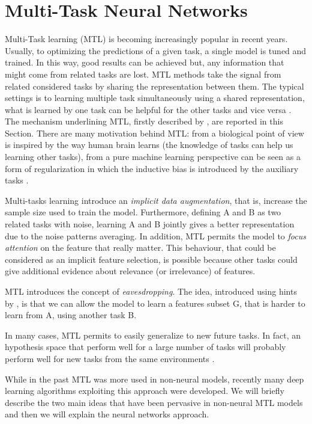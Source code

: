 \section{Multi-Task Neural Networks}\label{sec:MTLsection}
Multi-Task learning (MTL) is becoming increasingly popular in recent years.
Usually, to optimizing the predictions of a given task, a single model is
tuned and trained. In this way, good results can be achieved but, any
information that might come from related tasks are lost. MTL methods take
the signal from related considered tasks by sharing the
representation between them. The typical settings is to learning multiple
task simultaneously using a shared representation, what is learned by one
task can be helpful for the other tasks and vice versa \cite{Caruana97}. 
The mechanism underlining MTL, firstly described by \cite{Caruana97}, are reported in this Section.
There are many motivation behind MTL: from a biological point of view is
inspired by the way human brain learns (the knowledge of tasks can help us
learning other tasks), from a pure machine learning perspective
can be seen as a form of regularization in which the inductive bias is
introduced by the auxiliary tasks \cite{Ruder2017}. 

Multi-tasks learning introduce an \emph{implicit data augmentation}, that is, increase the sample size used to train the model. Furthermore, defining A and B as two related tasks with noise, learning A and B jointly gives a better representation due to the noise patterns averaging.
In addition, MTL permits the model to \emph{focus attention} on the feature that really matter. This behaviour, that could be considered as an implicit feature selection, is possible because other tasks could give additional evidence about relevance (or irrelevance) of features. 

MTL introduces the concept of \emph{eavesdropping}. The idea, introduced using hints by \cite{AbuMostafa1990}, is that we can allow the model to learn a features subset G, that is harder to learn from A, using another task B. 

In many cases, MTL permits to easily generalize to new future tasks. In fact, an hypothesis space that perform well for a large number of tasks will probably perform well for new tasks from the same environments \cite{Ruder2017}. 

While in the past MTL
was more used in non-neural models, recently many deep learning algorithms exploiting this approach were developed. We will briefly describe the two main ideas that have been pervasive in non-neural MTL models and then we will explain the neural networks approach.

